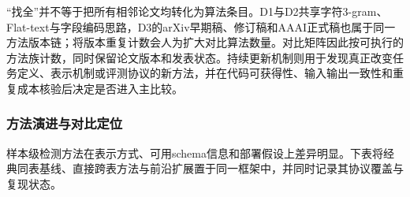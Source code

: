 \documentclass[
  chinese,
  12pt,
  a4paper,
  chinese,
  UTF8]{ctexart}
\begin{document}
``找全''并不等于把所有相邻论文均转化为算法条目。D1与D2共享字符3-gram、Flat-text与字段编码思路，D3的arXiv早期稿、修订稿和AAAI正式稿也属于同一方法版本链；将版本重复计数会人为扩大对比算法数量。对比矩阵因此按可执行的方法族计数，同时保留论文版本和发表状态。持续更新机制则用于发现真正改变任务定义、表示机制或评测协议的新方法，并在代码可获得性、输入输出一致性和重复成本核验后决定是否进入主比较。

\subsubsection{方法演进与对比定位}\label{ux65b9ux6cd5ux6f14ux8fdbux4e0eux5bf9ux6bd4ux5b9aux4f4d}

样本级检测方法在表示方式、可用schema信息和部署假设上差异明显。下表将经典同表基线、直接跨表方法与前沿扩展置于同一框架中，并同时记录其协议覆盖与复现状态。
\end{document}
